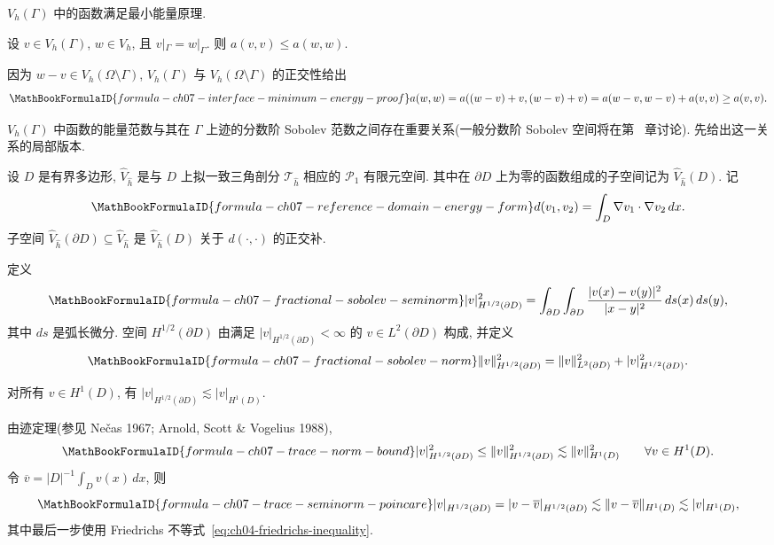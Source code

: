 $V_h(\Gamma)$ 中的函数满足最小能量原理.

\begin{Lemma}[最小能量原理]
\label{lem:ch07-interface-minimum-energy}
设 $v\in V_h(\Gamma)$, $w\in V_h$, 且 $v|_\Gamma=w|_\Gamma$. 则 $a(v,v)\leq a(w,w)$.
\end{Lemma}

\begin{Proof}
因为 $w-v\in V_h(\Omega\setminus\Gamma)$, $V_h(\Gamma)$ 与 $V_h(\Omega\setminus\Gamma)$ 的正交性给出
\[
\MathBookFormulaID{formula-ch07-interface-minimum-energy-proof}
a(w,w)=a((w-v)+v,(w-v)+v)
=a(w-v,w-v)+a(v,v)\geq a(v,v).
\]
\end{Proof}

$V_h(\Gamma)$ 中函数的能量范数与其在 $\Gamma$ 上迹的分数阶 Sobolev 范数之间存在重要关系(一般分数阶 Sobolev 空间将在第~ 章讨论). 先给出这一关系的局部版本.

设 $D$ 是有界多边形, $\widehat V_{\widehat h}$ 是与 $D$ 上拟一致三角剖分 $\mathcal T_{\widehat h}$ 相应的 $\mathcal P_1$ 有限元空间. 其中在 $\partial D$ 上为零的函数组成的子空间记为 $\widehat V_{\widehat h}(D)$. 记
\[
\MathBookFormulaID{formula-ch07-reference-domain-energy-form}
d(v_1,v_2)=\int_D\nabla v_1\cdot\nabla v_2\,dx.
\]
子空间 $\widehat V_{\widehat h}(\partial D)\subseteq\widehat V_{\widehat h}$ 是 $\widehat V_{\widehat h}(D)$ 关于 $d(\cdot,\cdot)$ 的正交补.

\begin{Definition}
\label{def:ch07-fractional-sobolev-seminorm}
定义
\[
\MathBookFormulaID{formula-ch07-fractional-sobolev-seminorm}
|v|_{H^{1/2}(\partial D)}^2
=\int_{\partial D}\int_{\partial D}
\frac{|v(x)-v(y)|^2}{|x-y|^2}\,ds(x)\,ds(y),
\]
其中 $ds$ 是弧长微分. 空间 $H^{1/2}(\partial D)$ 由满足 $|v|_{H^{1/2}(\partial D)}<\infty$ 的 $v\in L^2(\partial D)$ 构成, 并定义
\[
\MathBookFormulaID{formula-ch07-fractional-sobolev-norm}
\|v\|_{H^{1/2}(\partial D)}^2
=\|v\|_{L^2(\partial D)}^2+|v|_{H^{1/2}(\partial D)}^2.
\]
\end{Definition}

\begin{Lemma}
\label{lem:ch07-trace-seminorm-bound}
对所有 $v\in H^1(D)$, 有 $|v|_{H^{1/2}(\partial D)}\lesssim|v|_{H^1(D)}$.
\end{Lemma}

\begin{Proof}
由迹定理(参见 Nečas 1967; Arnold, Scott \& Vogelius 1988),
\[
\MathBookFormulaID{formula-ch07-trace-norm-bound}
|v|_{H^{1/2}(\partial D)}^2
\leq\|v\|_{H^{1/2}(\partial D)}^2
\lesssim\|v\|_{H^1(D)}^2
\qquad\forall v\in H^1(D).
\]
令 $\overline v=|D|^{-1}\int_Dv(x)\,dx$, 则
\[
\MathBookFormulaID{formula-ch07-trace-seminorm-poincare}
|v|_{H^{1/2}(\partial D)}
=|v-\overline v|_{H^{1/2}(\partial D)}
\lesssim\|v-\overline v\|_{H^1(D)}
\lesssim|v|_{H^1(D)},
\]
其中最后一步使用 Friedrichs 不等式~\eqref{eq:ch04-friedrichs-inequality}.
\end{Proof}

